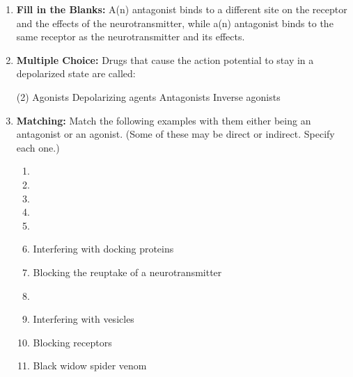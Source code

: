 \begin{enumerate}[label=\textbf{Q3.1.\arabic*}]
    \item \textbf{Fill in the Blanks:} A(n) \underline{\hspace{3cm}} antagonist binds to a different site on the receptor and \underline{\hspace{3cm}} the effects of the neurotransmitter, while a(n) \underline{\hspace{3cm}} antagonist binds to the same receptor as the neurotransmitter and \underline{\hspace{3cm}} its effects.

    \item \textbf{Multiple Choice:} Drugs that cause the action potential to stay in a depolarized state are called:
        \begin{tasks}[label=\textcolor{\documentTheme}{(\Alph*)}, item-format=\color{\documentTheme}, label-width=1.5em, item-indent=1.7em](2)
            \task Agonists
            \task Depolarizing agents
            \task Antagonists
            \task Inverse agonists
        \end{tasks}
\newpage
    \item \textbf{Matching:} Match the following examples with them either being an antagonist or an agonist. (Some of these may be direct or indirect. Specify each one.)
    \begin{wordbox}
        \begin{enumerate}
            \item {} %
            \item {} %
            \item {} %
            \item {} %
            \item {} %
            \item Interfering with docking proteins %
            \item Blocking the reuptake of a neurotransmitter %
            \item {} %
            \item Interfering with vesicles %
            \item Blocking receptors %
            \item Black widow spider venom %

\end{enumerate}
\end{wordbox}
\end{enumerate}
